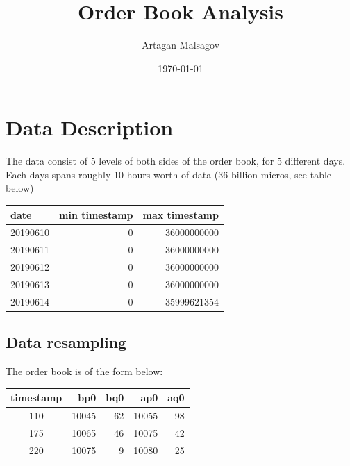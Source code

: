 \documentclass[english, 11pt, a4paper]{article}
\begin{document}
\baselineskip18pt


\title{Order Book Analysis}

\author{Artagan Malsagov}

\date{\today}


\maketitle



\section{Data Description}

The data consist of 5 levels of both sides of the order book, for 5 different days.
Each days spans roughly 10 hours worth of data (36 billion micros, see table below)

\begin{table}[H]
    \centering
    \begin{tabular}{lrr}
    \toprule
    date & min timestamp & max timestamp \\
    \midrule
    20190610 & 0 & 36000000000\\
    20190611 & 0 & 36000000000 \\
    20190612 & 0 & 36000000000 \\
    20190613 & 0 & 36000000000 \\
    20190614 & 0 & 35999621354 \\
    \bottomrule
    \end{tabular}
\end{table}

\subsection{Data resampling}
The order book is of the form below:

\begin{table}[H]
    \centering
    \begin{tabular}{crrrr}
    \toprule
    timestamp & bp0 & bq0 & ap0 & aq0 \\
    \midrule
    110 & 10045& 62 & 10055 & 98 \\
    175 & 10065& 46 & 10075 & 42 \\
    220 & 10075& 9 & 10080 & 25 \\
    \bottomrule
    \end{tabular}
\end{table}
\end{document}
